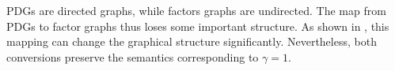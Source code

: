 \documentclass{article}
\begin{document}
	
	PDGs are directed graphs, while factors graphs are undirected. The
	map from PDGs to factor graphs thus loses some important structure.
	As shown in
    ,
	this mapping can change the graphical structure significantly.
	Nevertheless,
	both conversions preserve the semantics corresponding to $\gamma=1$.
	
\end{document}
